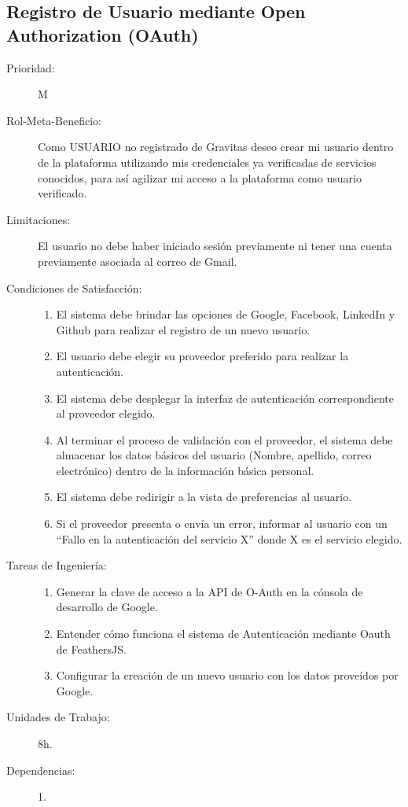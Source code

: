 \newpage

\subsection{Registro de Usuario mediante Open Authorization (OAuth)}

\begin{description}
    \item[Prioridad:] M
    \item[Rol-Meta-Beneficio:] Como USUARIO no registrado de Gravitas deseo crear mi usuario dentro de la plataforma utilizando mis credenciales ya verificadas de servicios conocidos, para así agilizar mi acceso a la plataforma como usuario verificado.
    \item[Limitaciones:] El usuario no debe haber iniciado sesión previamente ni tener una cuenta previamente asociada al correo de Gmail.
    \item[Condiciones de Satisfacción:] \hfill
        \begin{enumerate}
            \item El sistema debe brindar las opciones de Google, Facebook, LinkedIn y Github para realizar el registro de un nuevo usuario.
            \item El usuario debe elegir su proveedor preferido para realizar la autenticación.
            \item El sistema debe desplegar la interfaz de autenticación correspondiente al proveedor elegido.
            \item Al terminar el proceso de validación con el proveedor, el sistema debe almacenar los datos básicos del usuario (Nombre, apellido, correo electrónico) dentro de la información básica personal.
            \item El sistema debe redirigir a la vista de preferencias al usuario.
            \item Si el proveedor presenta o envía un error, informar al usuario con un “Fallo en la autenticación del servicio X” donde X es el servicio elegido.
        \end{enumerate}
    \item[Tareas de Ingeniería:] \hfill
        \begin{enumerate}
            \item Generar la clave de acceso a la API de O-Auth en la cónsola de desarrollo de Google.
            \item Entender cómo funciona el sistema de Autenticación mediante Oauth de FeathersJS.
            \item Configurar la creación de un nuevo usuario con los datos proveídos por Google.
        \end{enumerate}
    \item[Unidades de Trabajo:] 8h.
    \item[Dependencias:] 1.
\end{description}

